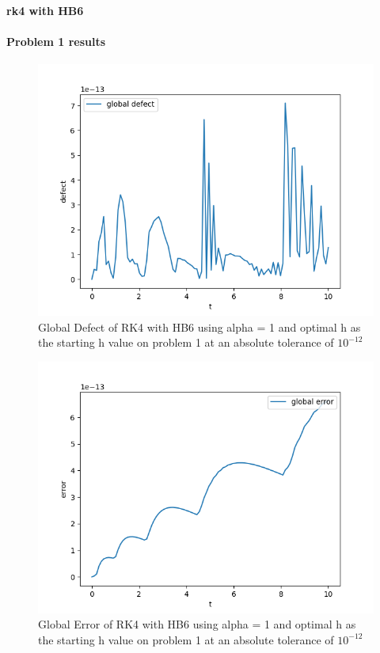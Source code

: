 \documentclass{article}
\begin{document}
\paragraph{rk4 with HB6}
\paragraph{Problem 1 results}
\begin{figure}[H]
\centering
\includegraphics[width=0.7\linewidth]{./figures/sharp_tolerance_rk4_with_hb6_p1_global_defect}
\caption{Global Defect of RK4 with HB6 using alpha = 1 and optimal h as the starting h value on problem 1 at an absolute tolerance of $10^{-12}$}
\label{fig:sharp_tolerance_rk4_with_hb6_p1_global_defect}
\end{figure}

\begin{figure}[H]
\centering
\includegraphics[width=0.7\linewidth]{./figures/sharp_tolerance_rk4_with_hb6_p1_global_error}
\caption{Global Error of RK4 with HB6 using alpha = 1 and optimal h as the starting h value on problem 1 at an absolute tolerance of $10^{-12}$}
\label{fig:sharp_tolerance_rk4_with_hb6_p1_global_error}
\end{figure}
\end{document}
